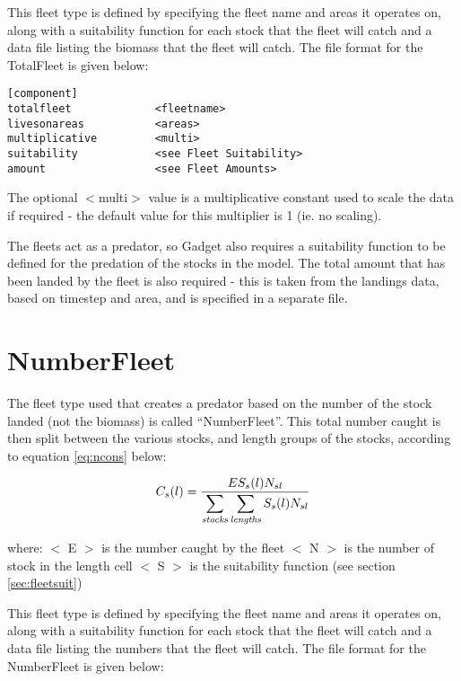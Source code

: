 \documentclass[]{book}
\begin{document}
This fleet type is defined by specifying the fleet name and areas it
operates on, along with a suitability function for each stock that the
fleet will catch and a data file listing the biomass that the fleet will
catch. The file format for the TotalFleet is given below:

\begin{verbatim}
[component]
totalfleet             <fleetname>
livesonareas           <areas>
multiplicative         <multi>
suitability            <see Fleet Suitability>
amount                 <see Fleet Amounts>
\end{verbatim}

The optional \(<\)multi\(>\) value is a multiplicative constant used to
scale the data if required - the default value for this multiplier is 1
(ie. no scaling).

The fleets act as a predator, so Gadget also requires a suitability
function to be defined for the predation of the stocks in the model. The
total amount that has been landed by the fleet is also required - this
is taken from the landings data, based on timestep and area, and is
specified in a separate file.

\hypertarget{sec:numberfleet}{%
\section{NumberFleet}\label{sec:numberfleet}}

The fleet type used that creates a predator based on the number of the
stock landed (not the biomass) is called ``NumberFleet''. This total
number caught is then split between the various stocks, and length
groups of the stocks, according to
equation \eqref{eq:ncons} below:

\begin{equation}
\label{eq:ncons}
C_{s}(l) = \frac{E S_{s}(l) N_{sl}}{\displaystyle \sum_{\it stocks} \sum_{\it lengths} S_{s}(l) N_{sl}}\end{equation}

where: \(<\) E \(>\) is the number caught by the fleet \(<\) N \(>\) is the
number of stock in the length cell \(<\) S \(>\) is the suitability function
(see section \ref{sec:fleetsuit})

This fleet type is defined by specifying the fleet name and areas it
operates on, along with a suitability function for each stock that the
fleet will catch and a data file listing the numbers that the fleet will
catch. The file format for the NumberFleet is given below:
\end{document}
